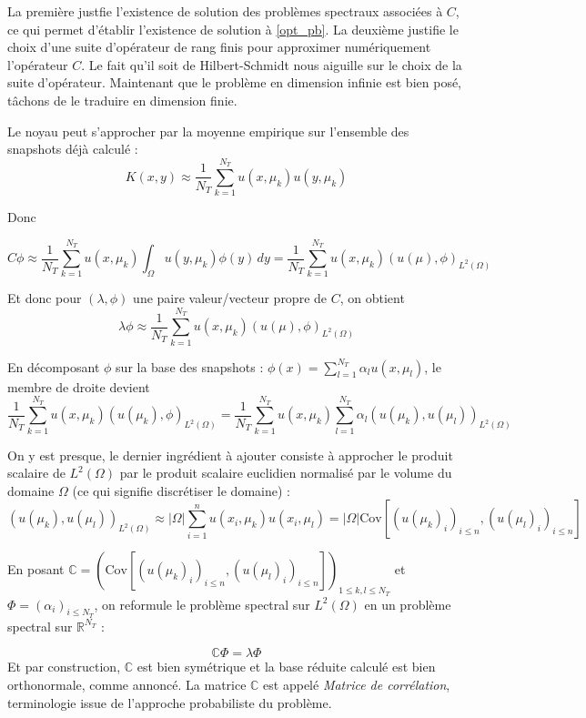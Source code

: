 \documentclass[12pt,a4paper,article]{memoir} %
\begin{document}
La première justfie l'existence de solution des problèmes spectraux associées à $C$, ce qui permet d'établir l'existence de solution à \eqref{opt_pb}.
La deuxième justifie le choix d'une suite d'opérateur de rang finis pour approximer numériquement l'opérateur $C$. Le fait qu'il soit de Hilbert-Schmidt
nous aiguille sur le choix de la suite d'opérateur. Maintenant que le problème en dimension infinie est bien posé, tâchons de le traduire en dimension finie. 
\newpage

Le noyau peut s'approcher par la moyenne empirique sur l'ensemble des snapshots déjà calculé : 
\[
K(x,y) \approx \frac{1}{N_T}\sum_{k = 1}^{N_T}u(x,\mu_k)u(y,\mu_k)
\]

Donc 

\[
C\phi \approx \frac{1}{N_T}\sum_{k = 1}^{N_T}u(x,\mu_k) \int_{\Omega}u(y,\mu_k)\phi(y)\, dy =  \frac{1}{N_T}\sum_{k = 1}^{N_T}u(x,\mu_k) (u(\mu),\phi)_{L^2(\Omega)}
\]

Et donc pour $(\lambda, \phi)$ une paire valeur/vecteur propre de $C$, on obtient
\[
\lambda \phi \approx  \frac{1}{N_T}\sum_{k = 1}^{N_T}u(x,\mu_k) (u(\mu),\phi)_{L^2(\Omega)}
\]

En décomposant $\phi$ sur la base des snapshots : $\phi(x) = \sum_{l = 1}^{N_T}\alpha_l u(x,\mu_l)$, le membre de droite devient
\[
\frac{1}{N_T}\sum_{k = 1}^{N_T}u(x,\mu_k) (u(\mu_k),\phi)_{L^2(\Omega)} = \frac{1}{N_T}\sum_{k = 1}^{N_T}u(x,\mu_k)\sum_{l = 1}^{N_T}\alpha_l(u(\mu_k), u(\mu_l))_{L^2(\Omega)}
\]

On y est presque, le dernier ingrédient à ajouter consiste à approcher le produit scalaire de $L^2(\Omega)$ par le produit scalaire euclidien
normalisé par le volume du domaine $\Omega$ (ce qui signifie discrétiser le domaine) : 
\[
    (u(\mu_k), u(\mu_l))_{L^2(\Omega)} \approx |\Omega|\sum_{i = 1}^{n}u(x_i, \mu_k)u(x_i, \mu_l) = |\Omega|\text{Cov}\left[(u(\mu_k)_i)_{i\leq n}, (u(\mu_l)_i)_{i\leq n}\right]
\]

En posant $\mathbb{C} = \left(\text{Cov}\left[(u(\mu_k)_i)_{i\leq n}, (u(\mu_l)_i)_{i\leq n}\right]\right)_{1 \leq k,l\leq N_T}$ et $\Phi = (\alpha_i)_{i\leq N_T}$, on reformule le problème
spectral sur $L^2(\Omega)$ en un problème spectral sur $\mathbb{R}^{N_T}$ :

\begin{equation}
    \mathbb{C}\Phi = \lambda\Phi
\end{equation} 
Et par construction, $\mathbb{C}$ est bien symétrique et la base réduite calculé est bien orthonormale, comme annoncé. La matrice $\mathbb{C}$ est appelé \textit{Matrice de corrélation}, terminologie issue 
de l'approche probabiliste du problème. 
\end{document}
